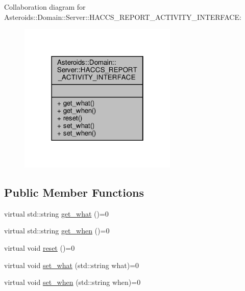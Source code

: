 Collaboration diagram for Asteroids\+:\+:Domain\+:\+:Server\+:\+:H\+A\+C\+C\+S\+\_\+\+R\+E\+P\+O\+R\+T\+\_\+\+A\+C\+T\+I\+V\+I\+T\+Y\+\_\+\+I\+N\+T\+E\+R\+F\+A\+CE\+:\nopagebreak
\begin{figure}[H]
\begin{center}
\leavevmode
\includegraphics[width=214pt]{classAsteroids_1_1Domain_1_1Server_1_1HACCS__REPORT__ACTIVITY__INTERFACE__coll__graph}
\end{center}
\end{figure}
\subsection*{Public Member Functions}
\begin{DoxyCompactItemize}
\item 
virtual std\+::string \hyperlink{classAsteroids_1_1Domain_1_1Server_1_1HACCS__REPORT__ACTIVITY__INTERFACE_a53c41f99bd22445fd466543577a257cb}{get\+\_\+what} ()=0
\item 
virtual std\+::string \hyperlink{classAsteroids_1_1Domain_1_1Server_1_1HACCS__REPORT__ACTIVITY__INTERFACE_a794189fbe2620106573d5ccfea47defe}{get\+\_\+when} ()=0
\item 
virtual void \hyperlink{classAsteroids_1_1Domain_1_1Server_1_1HACCS__REPORT__ACTIVITY__INTERFACE_a8c33539f165e6ac0fc83cb7500540d24}{reset} ()=0
\item 
virtual void \hyperlink{classAsteroids_1_1Domain_1_1Server_1_1HACCS__REPORT__ACTIVITY__INTERFACE_ad481b664dbfaff34a9426a2192c708f3}{set\+\_\+what} (std\+::string what)=0
\item 
virtual void \hyperlink{classAsteroids_1_1Domain_1_1Server_1_1HACCS__REPORT__ACTIVITY__INTERFACE_a552de5536f119e9d5f9fc01b95f740bb}{set\+\_\+when} (std\+::string when)=0
\end{DoxyCompactItemize}



